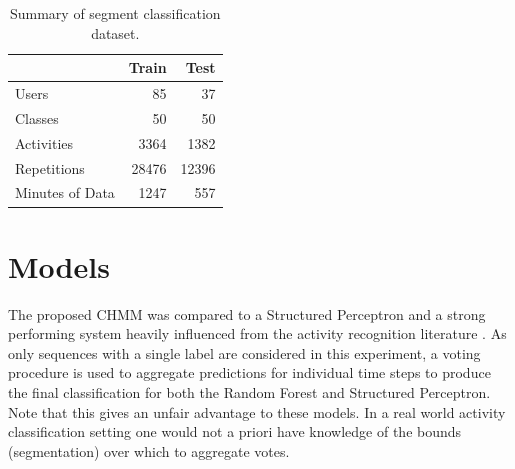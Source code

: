 \documentclass[12pt]{report}
\newcommand{\1}[0]{\mathbbm{1}}
\begin{document}
\begin{table}[ht]
    \centering
    \begin{tabular}{l r r}\hline
    & \textbf{Train} &\textbf{Test} \\\hline
    Users & 85 & 37\\
    Classes & 50 & 50\\
    Activities & 3364 & 1382\\
    Repetitions & 28476 & 12396\\
    Minutes of Data & 1247 & 557\\
    \end{tabular}
    \caption[Summary of segment classification dataset]{
        Summary of segment classification dataset.
    }
    \label{table:segment-dataset}
\end{table}

\section{Models}
The proposed \ac{CHMM} was compared to a Structured Perceptron \cite{perceptron-collins}
and a strong performing system heavily influenced from the activity recognition literature \cite{ms-activity}.
As only sequences with a single label are considered in this experiment, a voting procedure is used
to aggregate predictions for individual time steps to produce the final classification for both
the Random Forest and Structured Perceptron. Note that this gives an unfair advantage to these
models. In a real world activity classification setting one would not a priori have knowledge of
the bounds (segmentation) over which to aggregate votes.
\end{document}
